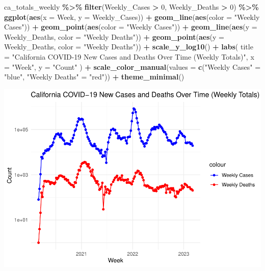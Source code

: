 \documentclass[
]{article}
\newenvironment{Shaded}{\begin{snugshade}}{\end{snugshade}}
\newcommand{\AttributeTok}[1]{\textcolor[rgb]{0.13,0.29,0.53}{#1}}
\newcommand{\DecValTok}[1]{\textcolor[rgb]{0.00,0.00,0.81}{#1}}
\newcommand{\FunctionTok}[1]{\textcolor[rgb]{0.13,0.29,0.53}{\textbf{#1}}}
\newcommand{\NormalTok}[1]{#1}
\newcommand{\OtherTok}[1]{\textcolor[rgb]{0.56,0.35,0.01}{#1}}
\newcommand{\SpecialCharTok}[1]{\textcolor[rgb]{0.81,0.36,0.00}{\textbf{#1}}}
\newcommand{\StringTok}[1]{\textcolor[rgb]{0.31,0.60,0.02}{#1}}
\begin{document}
\begin{Shaded}
\begin{Highlighting}[]
\NormalTok{ca\_totals\_weekly }\SpecialCharTok{\%\textgreater{}\%}
  \FunctionTok{filter}\NormalTok{(Weekly\_Cases }\SpecialCharTok{\textgreater{}} \DecValTok{0}\NormalTok{, Weekly\_Deaths }\SpecialCharTok{\textgreater{}} \DecValTok{0}\NormalTok{) }\SpecialCharTok{\%\textgreater{}\%}
  \FunctionTok{ggplot}\NormalTok{(}\FunctionTok{aes}\NormalTok{(}\AttributeTok{x =}\NormalTok{ Week, }\AttributeTok{y =}\NormalTok{ Weekly\_Cases)) }\SpecialCharTok{+}
  \FunctionTok{geom\_line}\NormalTok{(}\FunctionTok{aes}\NormalTok{(}\AttributeTok{color =} \StringTok{"Weekly Cases"}\NormalTok{)) }\SpecialCharTok{+}
  \FunctionTok{geom\_point}\NormalTok{(}\FunctionTok{aes}\NormalTok{(}\AttributeTok{color =} \StringTok{"Weekly Cases"}\NormalTok{)) }\SpecialCharTok{+}
  \FunctionTok{geom\_line}\NormalTok{(}\FunctionTok{aes}\NormalTok{(}\AttributeTok{y =}\NormalTok{ Weekly\_Deaths, }\AttributeTok{color =} \StringTok{"Weekly Deaths"}\NormalTok{)) }\SpecialCharTok{+}
  \FunctionTok{geom\_point}\NormalTok{(}\FunctionTok{aes}\NormalTok{(}\AttributeTok{y =}\NormalTok{ Weekly\_Deaths, }\AttributeTok{color =} \StringTok{"Weekly Deaths"}\NormalTok{)) }\SpecialCharTok{+}
  \FunctionTok{scale\_y\_log10}\NormalTok{() }\SpecialCharTok{+}
  \FunctionTok{labs}\NormalTok{(}
    \AttributeTok{title =} \StringTok{"California COVID{-}19 New Cases and Deaths Over Time (Weekly Totals)"}\NormalTok{,}
    \AttributeTok{x =} \StringTok{"Week"}\NormalTok{,}
    \AttributeTok{y =} \StringTok{"Count"}
\NormalTok{  ) }\SpecialCharTok{+}
  \FunctionTok{scale\_color\_manual}\NormalTok{(}\AttributeTok{values =} \FunctionTok{c}\NormalTok{(}\StringTok{"Weekly Cases"} \OtherTok{=} \StringTok{"blue"}\NormalTok{, }\StringTok{"Weekly Deaths"} \OtherTok{=} \StringTok{"red"}\NormalTok{)) }\SpecialCharTok{+}
  \FunctionTok{theme\_minimal}\NormalTok{()}
\end{Highlighting}
\end{Shaded}

\includegraphics{covid-data-analysis_files/figure-latex/state-analysis-1.pdf}
\end{document}
